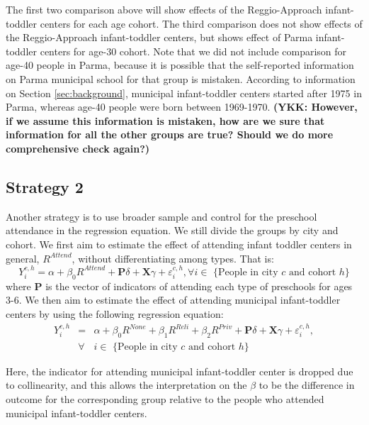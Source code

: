 The first two comparison above will show effects of the Reggio-Approach infant-toddler centers for each age cohort. The third comparison does not show effects of the Reggio-Approach infant-toddler centers, but shows effect of Parma infant-toddler centers for age-30 cohort. Note that we did not include comparison for age-40 people in Parma, because it is possible that the self-reported information on Parma municipal school for that group is mistaken. According to information on Section \ref{sec:background}, municipal infant-toddler centers started after 1975 in Parma, whereas age-40 people were born between 1969-1970. \textbf{(YKK: However, if we assume this information is mistaken, how are we sure that information for all the other groups are true? Should we do more comprehensive check again?)}

\subsection{Strategy 2}
Another strategy is to use broader sample and control for the preschool attendance in the regression equation. We still divide the groups by city and cohort. We first aim to estimate the effect of attending infant toddler centers in general, $R^{Attend}$, without differentiating among types. That is:
\begin{equation}
Y_{i}^{c,h} = \alpha + \beta_{0}R^{Attend} + \mathbf{P}\delta + \mathbf{X}\gamma + \varepsilon_{i}^{c,h}, \forall i \in \text{ \{People in city $c$ and cohort $h$\}}
\end{equation}
where $\mathbf{P}$ is the vector of indicators of attending each type of preschools for ages 3-6. We then aim to estimate the effect of attending municipal infant-toddler centers by using the following regression equation:
\begin{eqnarray}
Y_{i}^{c,h} & = & \alpha + \beta_{0}R^{None} + \beta_{1}R^{Reli} + \beta_{2}R^{Priv} + \mathbf{P}\delta +  \mathbf{X}\gamma + \varepsilon_{i}^{c,h}, \\ \nonumber
& \forall & i \in \text{ \{People in city $c$ and cohort $h$\}}
\end{eqnarray}

Here, the indicator for attending municipal infant-toddler center is dropped due to collinearity, and this allows the interpretation on the $\beta$ to be the difference in outcome for the corresponding group relative to the people who attended municipal infant-toddler centers. 



